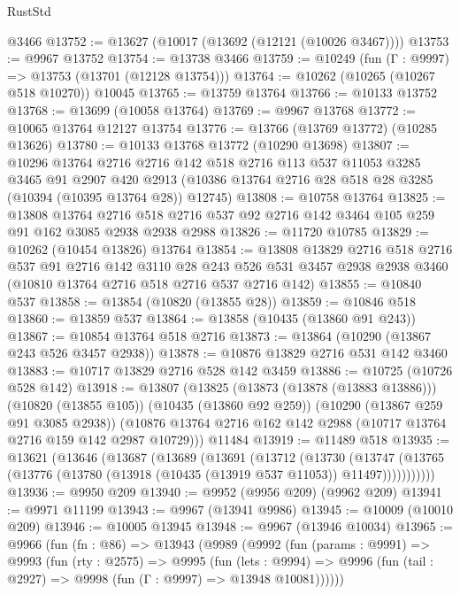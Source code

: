\begin{lexlean}{RustStd}
\begin{coremodule}
    @3466
@13752 := @13627 (@10017 (@13692 (@12121 (@10026 @3467))))
@13753 := @9967 @13752
@13754 := @13738 @3466
@13759 := @10249 (fun (Γ : @9997) => @13753 (@13701 (@12128 @13754)))
@13764 := @10262 (@10265 (@10267 @518 @10270)) @10045
@13765 := @13759 @13764
@13766 := @10133 @13752
@13768 := @13699 (@10058 @13764)
@13769 := @9967 @13768
@13772 := @10065 @13764 @12127 @13754
@13776 := @13766 (@13769 @13772) (@10285 @13626)
@13780 := @10133 @13768 @13772 (@10290 @13698)
@13807 := @10296
    @13764
    @2716
    @2716
    @142
    @518
    @2716
    @113
    @537
    @11053
    @3285
    @3465
    @91
    @2907
    @420
    @2913
    (@10386 @13764 @2716 @28 @518 @28 @3285 (@10394 (@10395 @13764 @28)) @12745)
@13808 := @10758 @13764
@13825 := @13808
    @13764
    @2716
    @518
    @2716
    @537
    @92
    @2716
    @142
    @3464
    @105
    @259
    @91
    @162
    @3085
    @2938
    @2938
    @2988
@13826 := @11720 @10785
@13829 := @10262 (@10454 @13826) @13764
@13854 := @13808
    @13829
    @2716
    @518
    @2716
    @537
    @91
    @2716
    @142
    @3110
    @28
    @243
    @526
    @531
    @3457
    @2938
    @2938
    @3460
    (@10810 @13764 @2716 @518 @2716 @537 @2716 @142)
@13855 := @10840 @537
@13858 := @13854 (@10820 (@13855 @28))
@13859 := @10846 @518
@13860 := @13859 @537
@13864 := @13858 (@10435 (@13860 @91 @243))
@13867 := @10854 @13764 @518 @2716
@13873 := @13864 (@10290 (@13867 @243 @526 @3457 @2938))
@13878 := @10876 @13829 @2716 @531 @142 @3460
@13883 := @10717 @13829 @2716 @528 @142 @3459
@13886 := @10725 (@10726 @528 @142)
@13918 := @13807
    (@13825
      (@13873 (@13878 (@13883 @13886)))
      (@10820 (@13855 @105))
      (@10435 (@13860 @92 @259))
      (@10290 (@13867 @259 @91 @3085 @2938))
      (@10876 @13764 @2716 @162 @142 @2988 (@10717 @13764 @2716 @159 @142 @2987 @10729)))
    @11484
@13919 := @11489 @518
@13935 := @13621
    (@13646
      (@13687
        (@13689
          (@13691
            (@13712
              (@13730
                (@13747
                  (@13765 (@13776 (@13780 (@13918 (@10435 (@13919 @537 @11053)) @11497)))))))))))
@13936 := @9950 @209
@13940 := @9952 (@9956 @209) (@9962 @209)
@13941 := @9971 @11199
@13943 := @9967 (@13941 @9986)
@13945 := @10009 (@10010 @209)
@13946 := @10005 @13945
@13948 := @9967 (@13946 @10034)
@13965 := @9966
    (fun (fn : @86) =>
    @13943
      (@9989
        (@9992
          (fun (params : @9991) =>
          @9993
            (fun (rty : @2575) =>
            @9995
              (fun (lets : @9994) =>
              @9996 (fun (tail : @2927) => @9998 (fun (Γ : @9997) => @13948 @10081))))))

\end{coremodule}
\end{lexlean}
